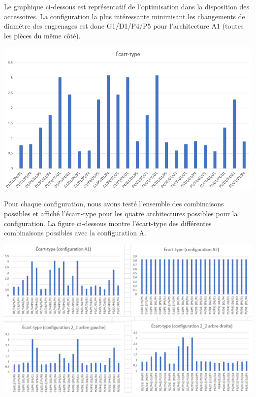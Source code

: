 \documentclass{config}
\begin{document}
\begin{spacing}{1.2}
Le graphique ci-dessous est représentatif de l'optimisation dans la disposition des accessoires. La configuration la plus intéressante minimisant les changements de diamètre des engrenages est donc G1/D1/P4/P5 pour l'architecture A1 (toutes les pièces du même côté).

\begin{center}
\includegraphics[scale=0.8]{graphique_ecart_type.PNG}
\end{center}

Pour chaque configuration, nous avons testé l'ensemble des combinaisons possibles et affiché l'écart-type pour les quatre architectures possibles pour la configuration. La figure ci-dessous montre l'écart-type des différentes combinaisons possibles avec la configuration A.

\begin{center}
\includegraphics[scale=0.75]{graphique_ecart_type_configurationA.PNG}
\end{center}


\end{spacing}
\end{document}
